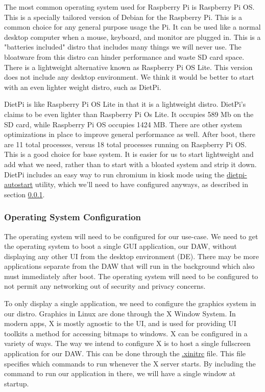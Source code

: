The most common operating system used for Raspberry Pi is Raspberry Pi OS. This is a
specially tailored version of Debian for the Raspberry Pi. This is a common choice for any
general purpose usage the Pi. It can be used like a normal desktop computer when a mouse,
keyboard, and monitor are plugged in. This is a "batteries included" distro that includes
many things we will never use. The bloatware from this distro can hinder performance and
waste SD card space. There is a lightweight alternative known as Raspberry Pi OS Lite.
This version does not include any desktop environment. We think it would be better to
start with an even lighter weight distro, such as DietPi.

DietPi is like Raspberry Pi OS Lite in that it is a lightweight distro. DietPi's claims to
be even lighter than Raspberry Pi Os Lite. It occupies 589 Mb on the SD card, while
Raspberry Pi OS occupies 1424 MB. There are other system optimizations in place to improve
general performance as well. After boot, there are 11 total processes, versus 18 total
processes running on Raspberry Pi OS. This is a good choice for base system. It is easier
for us to start lightweight and add what we need, rather than to start with a bloated
system and strip it down. DietPi includes an easy way to run chromium in kiosk mode using
the \url{dietpi-autostart} utility, which we'll need to have configured anyways, as
described in section \ref{sec:research:subsec:os_config}.


\subsubsection{Operating System Configuration}
\label{sec:research:subsec:os_config}

The operating system will need to be configured for our use-case. We need to get the
operating system to boot a single GUI application, our DAW, without displaying any other
UI from the desktop environment (DE). There may be more applications separate from the DAW
that will run in the background which also must  immediately after boot. The
operating system will need to be configured to not permit any networking out of security
and privacy concerns.

To only display a single application, we need to configure the graphics system in our
distro. Graphics in Linux are done through the X Window System. In modern apps, X is
mostly agnostic to the UI, and is used for providing UI toolkits a method for accessing
bitmaps to windows. X can be configured in a variety of ways. The way we intend to
configure X is to host a single fullscreen application for our DAW. This can be done
through the \url{.xinitrc} file. This file specifies which commands to run whenever the X
server starts. By including the command to run our application in there, we will have a
single window at startup.

